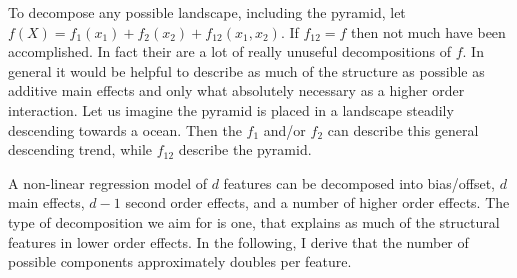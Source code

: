 To decompose any possible landscape, including the pyramid, let 
$f(X)= f_1(x_1) + f_2(x_2) + f_12(x_1,x_2)$. If $f_{12} = f$ then not much have been accomplished. In fact their are a lot of really unuseful decompositions of $f$. In general it would be helpful to describe as much of the structure as possible as additive main effects and only what absolutely necessary as a higher order interaction. Let us imagine the pyramid is placed in a landscape steadily descending towards a ocean. Then the $f_1$ and/or $f_2$ can describe this general descending trend, while $f_{12}$ describe the pyramid.

A non-linear regression model of $d$ features can be decomposed into bias/offset, $d$ main effects, $d-1$ second order effects, and a number of higher order effects. The type of decomposition we aim for is one, that explains as much of the structural features in lower order effects. In the following, I derive that the number of possible components approximately doubles per feature.

